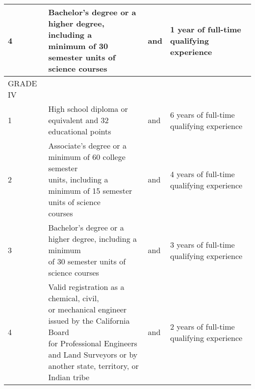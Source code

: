 \begin{table}[H]
\begin{tabular}{|l|p{6.5cm}|l|p{6.5cm}|}
4         & \makecell[l]{Bachelor’s   degree   or     a   higher   degree, including a\\ minimum of 30 semester   units of science courses                                                                                                                                                                              } & and & 1     year     of       full-time     qualifying   experience                                   \\ \hline
GRADE IV  &                                                                                                                                                                                                                                                                                               &     &                                                                                                 \\ \hline
1         & High  school  diploma    or  equivalent  and    32 educational points                                                                                                                                                                                                                         & and & 6    years    of      full-time    qualifying   experience                                      \\ \hline
2         & \makecell[l]{Associate’s   degree   or     a  minimum   of     60 college semester \\units, including a minimum of 15 semester units of   science\\ courses                                                                                                                                                   } & and & 4    years    of      full-time    qualifying   experience                                      \\ \hline
3         & \makecell[l]{Bachelor’s   degree   or     a   higher   degree, including a minimum\\ of 30 semester   units of science courses                                                                                                                                                                              } & and & 3    years    of      full-time    qualifying   experience                                      \\ \hline
4         &\makecell[l]{ Valid  registration  as    a  chemical,  civil,\\or mechanical     engineer     issued     by the California  Board \\ for    Professional  Engineers and  Land    Surveyors  or  by\\ another  state, territory, or   Indian tribe                                                   } & and & 2    years    of      full-time    qualifying   experience                                      \\ \hline

\end{tabular}
\end{table}
